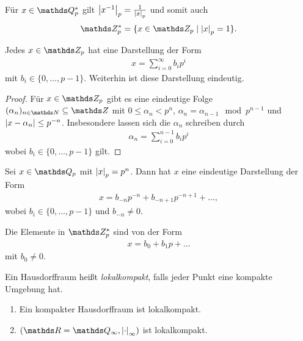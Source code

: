 Für $x\in \Q_p^\ast$ gilt $\left\vert x^{-1}\right\vert_p=\frac{1}{\left\vert x\right\vert_p}$ und somit auch
\begin{align*}
\Z_p^\ast=\{x\in \Z_p \mid \abs{x}_p=1\}.
\end{align*}



\begin{prop}
Jedes $x\in \Z_p$ hat eine Darstellung der Form
\begin{align*}
x=\sum_{i=0}^\infty b_i p^i
\end{align*}
mit $b_i \in \{0,\dots,p-1\}$. Weiterhin ist diese Darstellung eindeutig.
\end{prop}
\begin{proof}
Für $x \in \Z_p$ gibt es eine eindeutige Folge $(\alpha_n)_{n\in \N}\subseteq \Z$ mit $0 \leq \alpha_n<p^n$, $\alpha_n=\alpha_{n-1} \mod p^{n-1}$ und $\left\vert x-\alpha_n\right\vert\leq p^{-n}$.
Insbesondere lassen sich die $\alpha_n$ schreiben durch
\begin{align*}
\alpha_n=\sum_{i=0}^{n-1} b_i p^i
\end{align*}
wobei $b_i \in\{0,\dots,p-1\}$ gilt.
\end{proof}

\begin{prop}
Sei $x\in \Q_p$ mit $\left\vert x\right\vert_p=p^n$. Dann hat $x$ eine eindeutige Darstellung der Form
\begin{align*}
x=b_{-n}p^{-n}+b_{-n+1}p^{-n+1}+\dots,
\end{align*}
wobei $b_i \in \{0,\dots,p-1\}$ und $b_{-n}\not =0$.
\end{prop}

\begin{bem}
Die Elemente in $\Z_p^\ast$ sind von der Form
\begin{align*}
x=b_0+b_1p+\dots
\end{align*}
mit $b_0\not =0$.
\end{bem}

\begin{defi}
Ein Hausdorffraum heißt \emph{lokalkompakt}, falls jeder Punkt eine kompakte Umgebung hat.
\end{defi}

\begin{bsp}
\begin{enumerate}[label=(\roman*)]
\item Ein kompakter Hausdorffraum ist lokalkompakt.
\item $(\R=\Q_\infty,\abs{\cdot}_\infty)$ ist lokalkompakt.
\end{enumerate}
\end{bsp}


